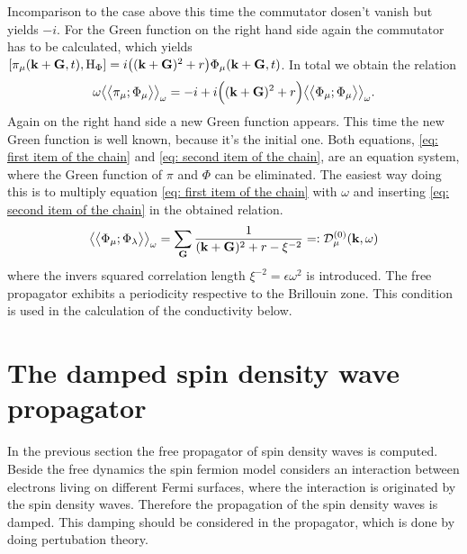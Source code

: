 Incomparison to the case above this time the commutator dosen't vanish but yields $-i$.
For the Green function on the right hand side again the commutator has to be calculated, which yields $\comm{\pi_{\mu}(\vb{k}+\vb{G},t)}{\mt{H}_{\Phi}} = i \big((\vb{k}+\vb{G})^{2} + r\big) \Phi_{\mu}(\vb{k}+\vb{G},t)$.
In total we obtain the relation
%
\begin{align}
	\omega \green{\pi_{\mu}}{\Phi_{\mu}}_{\omega} = 
		-i + i\Big((\vb{k}+\vb{G})^{2} + r \Big) \green{\Phi_{\mu}}{\Phi_{\mu}}_{\omega}.
		\label{eq: second item of the chain}
\end{align}
%
Again on the right hand side a new Green function appears.
This time the new Green function is well known, because it's the initial one.
Both equations, \eqref{eq: first item of the chain} and \eqref{eq: second item of the chain}, are an equation system, where the Green function of $\pi$ and $\Phi$ can be eliminated.
The easiest way doing this is to multiply equation \eqref{eq: first item of the chain} with $\omega$ and inserting \eqref{eq: second item of the chain} in the obtained relation.
%
\begin{align}
	\green{\Phi_{\mu}}{\Phi_{\lambda}}_{\omega} = \sum\limits_{\vb{G}} \frac{1}{(\vb{k}+\vb{G})^{2} + r - \xi^{-2}} =: \mathcal{D}_{\mu}^{(0)}(\vb{k},\omega)
	\label{eq: free spin density wave propagator}
\end{align}
%
where the invers squared correlation length $\xi^{-2} = \epsilon \omega^{2}$ is introduced.
The free propagator exhibits a periodicity respective to the Brillouin zone.
This condition is used in the calculation of the conductivity below. 
%
%
\section{The damped spin density wave propagator}
\label{sec: damped propagator}
%
%
In the previous section the free propagator of spin density waves is computed.
Beside the free dynamics the spin fermion model considers an interaction between electrons living on different Fermi surfaces, where the interaction is originated by the spin density waves.
Therefore the propagation of the spin density waves is damped.
This damping should be considered in the propagator, which is done by doing pertubation theory.

